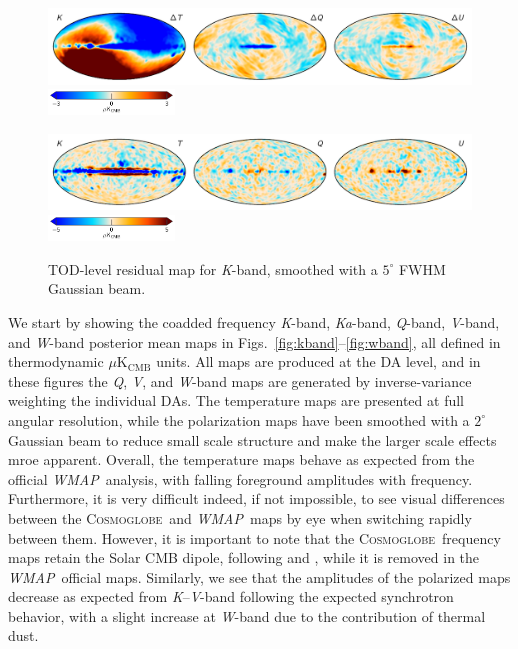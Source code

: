\documentclass[twocolumn]{../../common/aa}
\def\WMAP{\emph{WMAP}}
\def\WMAPnine{\emph{WMAP9}}
\newcommand{\cosmoglobe}{\textsc{Cosmoglobe}}
\newcommand{\K}[0]{\textit K}
\newcommand{\Ka}[0]{\textit{Ka}}
\newcommand{\Q}[0]{\textit Q}
\newcommand{\V}[0]{\textit V}
\newcommand{\W}[0]{\textit W}
\begin{document}
\begin{figure}[t]
	\centering
	\includegraphics[width=\textwidth]{figures/023-WMAP_K_sampdiff.pdf}\\
	\includegraphics[width=0.30\textwidth]{figures/cbar_3uK.pdf}        
	\caption{Difference between two \K-band Gibbs samples, smoothed to $7^\circ$.}
        \label{fig:Ksampdiff}

	\centering
	\includegraphics[width=\textwidth]{figures/tod_res_K_IQU.pdf}\\
	\includegraphics[width=0.30\textwidth]{figures/cbar_5uK.pdf}
	\caption{TOD-level residual map for \K-band, smoothed with a $5^\circ$ FWHM Gaussian beam.}
        \label{fig:todres_K}
\end{figure}

We start by showing the coadded frequency \K-band, \Ka-band, \Q-band, \V-band, and \W-band posterior mean maps in Figs.~\ref{fig:kband}--\ref{fig:wband}, all defined in thermodynamic  $\mu\mathrm{K_{CMB}}$ units. All maps are produced at the DA level, and in these figures the \Q, \V, and \W-band maps are generated by inverse-variance weighting the individual DAs. The temperature maps are presented at full angular resolution, while the polarization maps have been smoothed with a $2^\circ$ Gaussian beam to reduce small scale structure and make the larger scale effects mroe apparent. Overall, the temperature maps behave as expected from the official \WMAP\ analysis, with falling foreground amplitudes with frequency. Furthermore, it is very difficult indeed, if not impossible, to see visual differences between the \cosmoglobe\ and \WMAP\ maps by eye when switching rapidly between them. However, it is important to note that the \cosmoglobe\ frequency maps retain the Solar CMB dipole, following \citet{npipe} and \citet{bp01}, while it is removed in the \WMAP\ official maps. Similarly, we see that the amplitudes of the polarized maps decrease as expected from \K--\V-band following the expected synchrotron behavior, with a slight increase at \W-band due to the contribution of thermal dust. %
\end{document}
